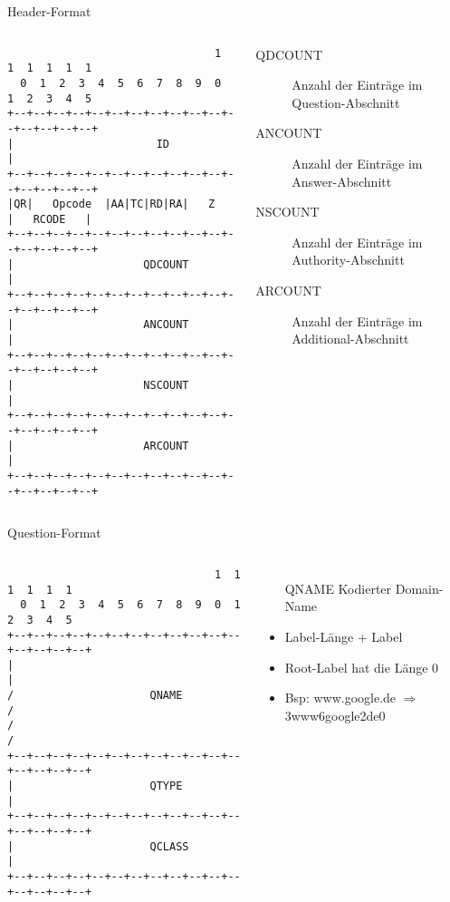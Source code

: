 \documentclass{beamer}
\begin{document}
  \begin{frame}[fragile]{\mytitle}{Header-Format}
    \begin{columns}[c]
      \column{5cm}
      \tiny{
        \begin{verbatim}
                                1  1  1  1  1  1
  0  1  2  3  4  5  6  7  8  9  0  1  2  3  4  5
+--+--+--+--+--+--+--+--+--+--+--+--+--+--+--+--+
|                      ID                       |
+--+--+--+--+--+--+--+--+--+--+--+--+--+--+--+--+
|QR|   Opcode  |AA|TC|RD|RA|   Z    |   RCODE   |
+--+--+--+--+--+--+--+--+--+--+--+--+--+--+--+--+
|                    QDCOUNT                    |
+--+--+--+--+--+--+--+--+--+--+--+--+--+--+--+--+
|                    ANCOUNT                    |
+--+--+--+--+--+--+--+--+--+--+--+--+--+--+--+--+
|                    NSCOUNT                    |
+--+--+--+--+--+--+--+--+--+--+--+--+--+--+--+--+
|                    ARCOUNT                    |
+--+--+--+--+--+--+--+--+--+--+--+--+--+--+--+--+
        \end{verbatim}
      }
      \column{7cm}
        \footnotesize{
        \begin{description}
          \item[QDCOUNT] Anzahl der Einträge im Question-Abschnitt
          \item[ANCOUNT] Anzahl der Einträge im Answer-Abschnitt
          \item[NSCOUNT] Anzahl der Einträge im Authority-Abschnitt
          \item[ARCOUNT] Anzahl der Einträge im Additional-Abschnitt
        \end{description}
      }
    \end{columns}
\end{frame}

  \begin{frame}[fragile]{\mytitle}{Question-Format}
    \begin{columns}[c]
      \column{5cm}
      \tiny{
        \begin{verbatim}
                                1  1  1  1  1  1
  0  1  2  3  4  5  6  7  8  9  0  1  2  3  4  5
+--+--+--+--+--+--+--+--+--+--+--+--+--+--+--+--+
|                                               |
/                     QNAME                     /
/                                               /
+--+--+--+--+--+--+--+--+--+--+--+--+--+--+--+--+
|                     QTYPE                     |
+--+--+--+--+--+--+--+--+--+--+--+--+--+--+--+--+
|                     QCLASS                    |
+--+--+--+--+--+--+--+--+--+--+--+--+--+--+--+--+
        \end{verbatim}
      }
      \column{1cm}
      \column{6cm}
        \footnotesize{
        \begin{itemize}
          \item[QNAME] Kodierter Domain-Name
          \item Label-Länge + Label
          \item Root-Label hat die Länge 0
          \item Bsp: www.google.de $\Rightarrow$ 3www6google2de0
      \end{itemize}
      }
    \end{columns}
\end{frame}
\end{document}
